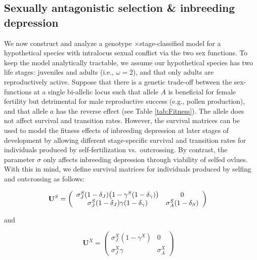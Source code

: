 \documentclass[11pt]{article}
\def\mbf#1{\mathbf{#1}}
\begin{document}
\subsection*{Sexually antagonistic selection \& inbreeding depression} \label{sec:SAsel}

We now construct and analyze a genotype $\times$stage-classified model for a hypothetical species with intralocus sexual conflict via the two sex functions. To keep the model analytically tractable, we assume our hypothetical species has two life stages: juveniles and adults (i.e., $\omega = 2$), and that only adults are reproductively active. Suppose that there is a genetic trade-off between the sex-functions at a single bi-allelic locus such that allele $A$ is beneficial for female fertility but detrimental for male reproductive success (e.g., pollen production), and that allele $a$ has the reverse effect (see Table \ref{tab:Fitness}). The allele does not affect survival and transition rates. However, the survival matrices can be used to model the fitness effects of inbreeding depression at later stages of development by allowing different stage-specific survival and transition rates for individuals produced by self-fertilization vs.~outcrossing. By contrast, the parameter $\sigma$ only affects inbreeding depression through viability of selfed ovlues. With this in mind, we define survival matrices for individuals produced by selfing and outcrossing as follows:
\begin{linenomath*}
\begin{equation} \label{eq:US}
	\mbf{U}^S = \left(
					\begin{array}{cc}
						\sigma^S_J (1 - \delta_J) \big(1 - \gamma^S (1 - \delta_{\gamma}) \big) & 0 \\
						\sigma^S_J (1 - \delta_J) \gamma (1 - \delta_{\gamma})      & \sigma^S_A (1 - \delta_S)
					\end{array}
				\right) \\
\end{equation}
\end{linenomath*}
\noindent and 
\begin{linenomath*}
\begin{equation}\label{eq:UX}
	\mbf{U}^X = \left(
					\begin{array}{cc}
						\sigma^X_J(1 - \gamma^X) & 0 \\
						\sigma^X_J \gamma      & \sigma^X_A
					\end{array}
				\right)
\end{equation}
\end{linenomath*}
\end{document}
